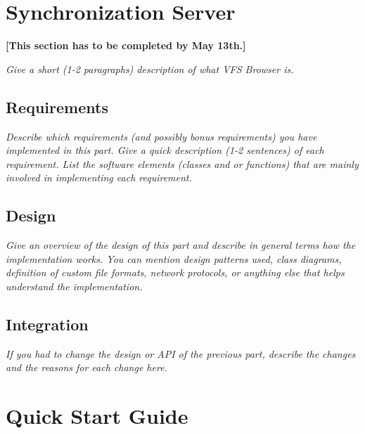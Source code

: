 \documentclass[a4paper,12pt]{article}
\begin{document}

\section{Synchronization Server}

\textbf{[This section has to be completed by May 13th.]}

\emph{Give a short (1-2 paragraphs) description of what VFS Browser is.}


\subsection{Requirements}

\emph{Describe which requirements (and possibly bonus requirements) you have implemented in this part. Give a quick description (1-2 sentences) of each requirement. List the software elements (classes and or functions) that are mainly involved in implementing each requirement.}


\subsection{Design}

\emph{Give an overview of the design of this part and describe in general terms how the implementation works. You can mention design patterns used, class diagrams, definition of custom file formats, network protocols, or anything else that helps understand the implementation.}


\subsection{Integration}

\emph{If you had to change the design or API of the previous part, describe the changes and the reasons for each change here.}

\fi


\section{Quick Start Guide}
\end{document}
